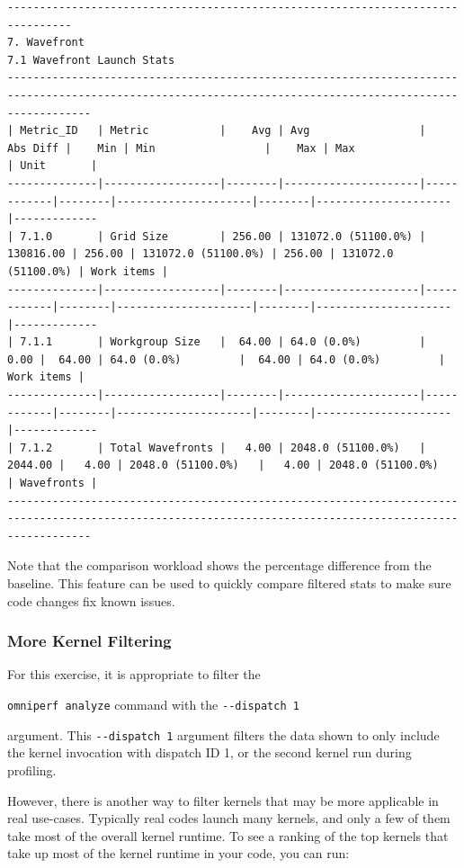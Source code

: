 \documentclass[
]{article}
\let\oldtexttt\texttt
\renewcommand{\texttt}[1]{
  \colorbox{Light}{\oldtexttt{#1}}
}
\begin{document}
\begin{Verbatim}[fontsize=\tiny]
--------------------------------------------------------------------------------
7. Wavefront
7.1 Wavefront Launch Stats
---------------------------------------------------------------------------------------------------------------------------------------------------------
| Metric_ID   | Metric           |    Avg | Avg                 |   Abs Diff |    Min | Min                 |    Max | Max                 | Unit       |
--------------|------------------|--------|---------------------|------------|--------|---------------------|--------|---------------------|-------------
| 7.1.0       | Grid Size        | 256.00 | 131072.0 (51100.0%) |  130816.00 | 256.00 | 131072.0 (51100.0%) | 256.00 | 131072.0 (51100.0%) | Work items |
--------------|------------------|--------|---------------------|------------|--------|---------------------|--------|---------------------|-------------
| 7.1.1       | Workgroup Size   |  64.00 | 64.0 (0.0%)         |       0.00 |  64.00 | 64.0 (0.0%)         |  64.00 | 64.0 (0.0%)         | Work items |
--------------|------------------|--------|---------------------|------------|--------|---------------------|--------|---------------------|-------------
| 7.1.2       | Total Wavefronts |   4.00 | 2048.0 (51100.0%)   |    2044.00 |   4.00 | 2048.0 (51100.0%)   |   4.00 | 2048.0 (51100.0%)   | Wavefronts |
---------------------------------------------------------------------------------------------------------------------------------------------------------
\end{Verbatim}

Note that the comparison workload shows the percentage difference from
the baseline. This feature can be used to quickly compare filtered stats
to make sure code changes fix known issues.

\hypertarget{more-kernel-filtering}{%
\subsubsection{More Kernel Filtering}\label{more-kernel-filtering}}

For this exercise, it is appropriate to filter the
\texttt{omniperf\ analyze} command with the \texttt{-\/-dispatch\ 1}
argument. This \texttt{-\/-dispatch\ 1} argument filters the data shown
to only include the kernel invocation with dispatch ID 1, or the second
kernel run during profiling.

However, there is another way to filter kernels that may be more
applicable in real use-cases. Typically real codes launch many kernels,
and only a few of them take most of the overall kernel runtime. To see a
ranking of the top kernels that take up most of the kernel runtime in
your code, you can run:
\end{document}
